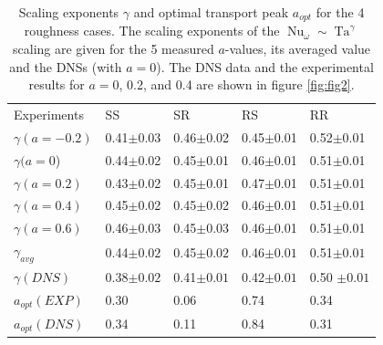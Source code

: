 \documentclass[aps,prl,superscriptaddress,preprint]{revtex4}
\newcommand{\Ta}{\operatorname{Ta}}
\newcommand{\Nu}{\operatorname{Nu}_{\omega}}
\begin{document}
\begin{table}[!h]
\caption{\label{tab:one}Scaling exponents $\gamma$ and optimal transport peak $a_{opt}$ for the 4 roughness cases. The scaling exponents of the $\Nu \sim \Ta^{\gamma}$ scaling are given for the 5 measured $a$-values, its averaged value and the DNSs (with $a=0$). The DNS data and the experimental results for $a=0$, 0.2, and 0.4 are shown in figure \ref{fig:fig2}.}
\begin{ruledtabular}
\begin{tabular}{lllll}
Experiments & SS & SR & RS &RR\\
$\gamma(a=-0.2)$  &0.41$\pm$0.03   & 0.46$\pm$0.02 &   0.45$\pm$0.01  &  0.52$\pm$0.01\\
$\gamma(a=0$)   & 0.44$\pm$0.02  &  0.45$\pm$0.01  &  0.46$\pm$0.01  &  0.51$\pm$0.01\\
$\gamma(a=0.2)$ &   0.43$\pm$0.02   & 0.45$\pm$0.01 &  0.47$\pm$0.01   & 0.51$\pm$0.01\\
$\gamma(a=0.4)$  &  0.45$\pm$0.02 &  0.45$\pm$0.02  &  0.46$\pm$0.01 &   0.51$\pm$0.01\\
$\gamma(a=0.6)$   &  0.46$\pm$0.03  &  0.45$\pm$0.03  &  0.46$\pm$0.01  &  0.51$\pm$0.01 \\
$\gamma_{avg}$ & 0.44$\pm0.02$ & 0.45$\pm0.02$ & 0.46$\pm0.01$ & 0.51$\pm0.01$ \\ \hline
$\gamma(DNS)$ & 0.38$\pm0.02$ & 0.41$\pm0.01$ & 0.42$\pm0.01$ & 0.50 $\pm0.01$ \\ \hline

$a_{opt}(EXP)$ & 0.30 &  0.06 & 0.74 &  0.34 \\
$a_{opt}(DNS)$ & 0.34 &  0.11 & 0.84 &  0.31 \\

\end{tabular}
\end{ruledtabular}
\end{table}
\fi
\end{document}
